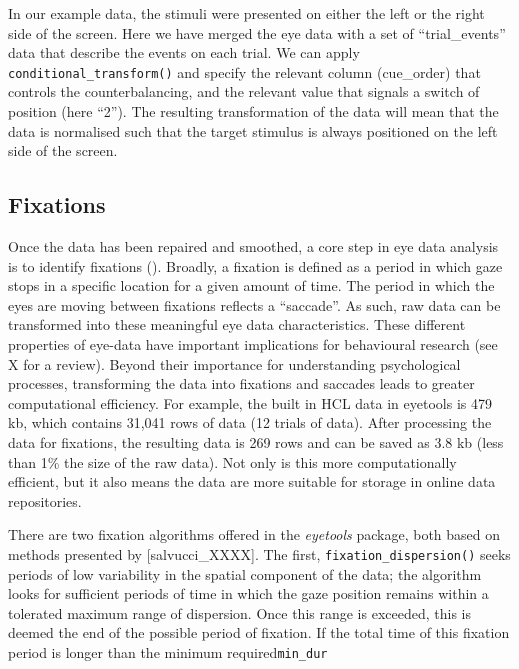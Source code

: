 \documentclass[
  man,
  floatsintext,
  longtable,
  nolmodern,
  notxfonts,
  notimes,
  colorlinks=true,linkcolor=blue,citecolor=blue,urlcolor=blue]{apa7}
\begin{document}
In our example data, the stimuli were presented on either the left or
the right side of the screen. Here we have merged the eye data with a
set of ``trial\_events'' data that describe the events on each trial. We
can apply \texttt{conditional\_transform()} and specify the relevant
column (cue\_order) that controls the counterbalancing, and the relevant
value that signals a switch of position (here ``2''). The resulting
transformation of the data will mean that the data is normalised such
that the target stimulus is always positioned on the left side of the
screen.

\subsection{Fixations}\label{fixations}

Once the data has been repaired and smoothed, a core step in eye data
analysis is to identify fixations (). Broadly, a fixation is defined as a period in which
gaze stops in a specific location for a given amount of time. The period
in which the eyes are moving between fixations reflects a ``saccade''.
As such, raw data can be transformed into these meaningful eye data
characteristics. These different properties of eye-data have important
implications for behavioural research (see X for a review). Beyond their
importance for understanding psychological processes, transforming the
data into fixations and saccades leads to greater computational
efficiency. For example, the built in HCL data in eyetools is 479 kb,
which contains 31,041 rows of data (12 trials of data). After processing
the data for fixations, the resulting data is 269 rows and can be saved
as 3.8 kb (less than 1\% the size of the raw data). Not only is this
more computationally efficient, but it also means the data are more
suitable for storage in online data repositories.

There are two fixation algorithms offered in the \emph{eyetools}
package, both based on methods presented by {[}salvucci\_XXXX{]}. The
first, \texttt{fixation\_dispersion()} seeks periods of low variability
in the spatial component of the data; the algorithm looks for sufficient
periods of time in which the gaze position remains within a tolerated
maximum range of dispersion. Once this range is exceeded, this is deemed
the end of the possible period of fixation. If the total time of this
fixation period is longer than the minimum required\texttt{min\_dur}
\end{document}

